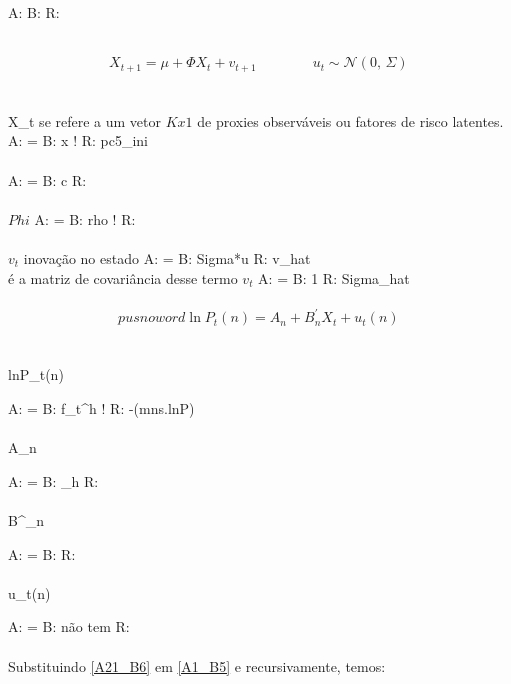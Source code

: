 \documentclass[12pt]{article}
\begin{document}
 

A: 
B: 
R: 

\\
\begin{equation} \label{A1_B5} %
X_{t+1}  =  \mu + \Phi X_{t} + v_{t+1} \qquad \qquad  u_{t} \sim \mathcal{N}(0,\,\Sigma)\,
\end{equation}
\\

\\
X_{t} se refere a um vetor $Kx1$ de proxies observáveis ou fatores de risco latentes.
A: =
B: x    !
R: pc5_ini
\\

\\
\mu
A: =
B: c
R: 
\\

\\
$Phi$
A: =
B: rho  !
R: 
\\

\\
$v_t$ inovação no estado
A: =
B: Sigma*u
R: v_hat
\\


\Sigma é a matriz de covariância desse termo $v_t$
A: =
B: 1
R: Sigma_hat
\\

\\
\begin{equation} \label{A21_B6}  pus no word        %
\ln P_t(n)  =  A_n + B^{\prime}_n X_t + u_t(n) \,
\end{equation}
\\

\\
lnP_t(n) 

A: =
B: f_t^h    !
R: -(mns.lnP)
\\


\\
A_n

A: =
B: \alpha_h
R: 
\\

\\
B^{\prime}_n


A: =
B: \beta
R:
\\

\\
u_t(n)

A: =
B: não tem
R: 
\\


\\

Substituindo \ref{A21_B6} em \ref{A1_B5} e recursivamente, temos:    %
\end{document}

